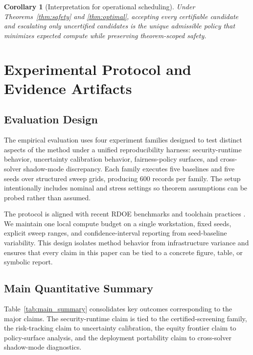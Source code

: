 \documentclass{article} %
\newtheorem{corollary}{Corollary}[theorem]
\begin{document}
\begin{corollary}[Interpretation for operational scheduling]
Under Theorems~\ref{thm:safety} and \ref{thm:optimal}, accepting every certifiable candidate and escalating only uncertified candidates is the unique admissible policy that minimizes expected compute while preserving theorem-scoped safety.
\end{corollary}

\section{Experimental Protocol and Evidence Artifacts}
\subsection{Evaluation Design}
The empirical evaluation uses four experiment families designed to test distinct aspects of the method under a unified reproducibility harness: security-runtime behavior, uncertainty calibration behavior, fairness-policy surfaces, and cross-solver shadow-mode discrepancy. Each family executes five baselines and five seeds over structured sweep grids, producing 600 records per family. The setup intentionally includes nominal and stress settings so theorem assumptions can be probed rather than assumed.

The protocol is aligned with recent RDOE benchmarks and toolchain practices \citep{KA05,KA32,KA36,KA38,KA40,KA41}. We maintain one local compute budget on a single workstation, fixed seeds, explicit sweep ranges, and confidence-interval reporting from seed-baseline variability. This design isolates method behavior from infrastructure variance and ensures that every claim in this paper can be tied to a concrete figure, table, or symbolic report.

\subsection{Main Quantitative Summary}
Table~\ref{tab:main_summary} consolidates key outcomes corresponding to the major claims. The security-runtime claim is tied to the certified-screening family, the risk-tracking claim to uncertainty calibration, the equity frontier claim to policy-surface analysis, and the deployment portability claim to cross-solver shadow-mode diagnostics.
\end{document}

